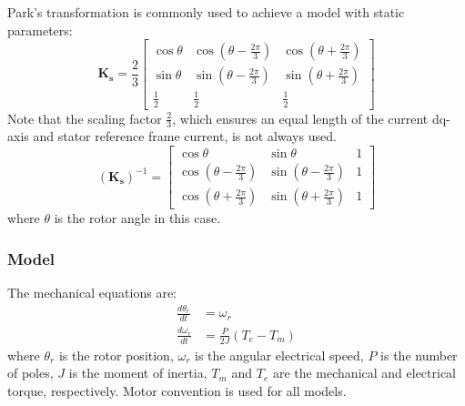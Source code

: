 Park's transformation is commonly used to achieve a model with static parameters:
%
\begin{equation}
\mathbf{K_s} = \frac{2}{3}
 \begin{bmatrix} 
  \cos \theta & \cos(\theta-\frac{2\pi}{3}) & \cos(\theta+\frac{2\pi}{3}) \\
  \sin \theta & \sin(\theta-\frac{2\pi}{3}) & \sin(\theta+\frac{2\pi}{3}) \\
  \frac{1}{2} & \frac{1}{2} & \frac{1}{2}
 \end{bmatrix}
\end{equation}
%
Note that the scaling factor $\frac{2}{3}$, which ensures an equal length of the current dq-axis and stator reference frame current, is not always used. 
%
\begin{equation}
(\mathbf{K_s})^{-1} = 
 \begin{bmatrix} 
  \cos \theta & \sin \theta & 1 \\
  \cos(\theta-\frac{2\pi}{3}) & \sin(\theta-\frac{2\pi}{3}) & 1 \\
  \cos(\theta+\frac{2\pi}{3}) & \sin(\theta+\frac{2\pi}{3}) & 1
 \end{bmatrix}
\end{equation}
%
where $\theta$ is the rotor angle in this case.

\subsubsection{Model}

The mechanical equations are:
%
\begin{align}
\frac{d\theta_r}{dt} &= \omega_r \label{eq:d_theta} \\
\frac{d\omega_r}{dt} &= \frac{P}{2J} (T_e-T_m) \label{eq:d_omega}
\end{align}
%
where $\theta_r$ is the rotor position, $\omega_r$ is the angular electrical speed, $P$ is the number of poles, $J$ is the moment of inertia, $T_m$ and $T_e$ are the mechanical and electrical torque, respectively. Motor convention is used for all models. 

